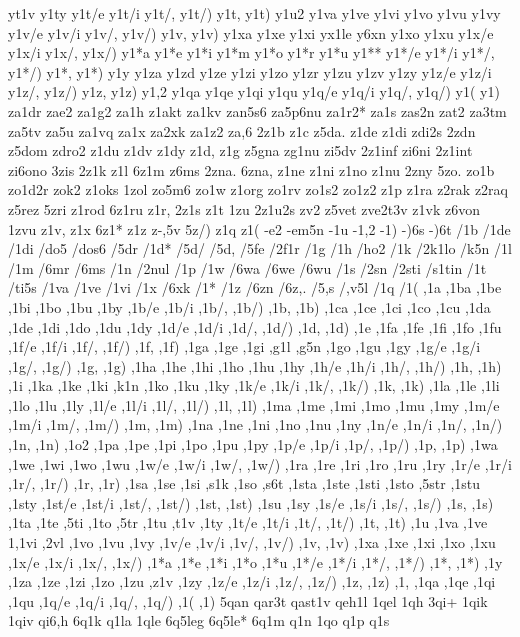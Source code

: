 {{yt1v
y1ty
y1t/e
y1t/i
y1t/,
y1t/)
y1t,
y1t)
y1u2
y1va
y1ve
y1vi
y1vo
y1vu
y1vy
y1v/e
y1v/i
y1v/,
y1v/)
y1v,
y1v)
y1xa
y1xe
y1xi
yx1le
y6xn
y1xo
y1xu
y1x/e
y1x/i
y1x/,
y1x/)
y1*a
y1*e
y1*i
y1*m
y1*o
y1*r
y1*u
y1**
y1*/e
y1*/i
y1*/,
y1*/)
y1*,
y1*)
y1y
y1za
y1zd
y1ze
y1zi
y1zo
y1zr
y1zu
y1zv
y1zy
y1z/e
y1z/i
y1z/,
y1z/)
y1z,
y1z)
y1,2
y1qa
y1qe
y1qi
y1qu
y1q/e
y1q/i
y1q/,
y1q/)
y1(
y1)
za1dr
zae2
za1g2
za1h
z1akt
za1kv
zan5s6
za5p6nu
za1r2*
za1s
zas2n
zat2
za3tm
za5tv
za5u
za1vq
za1x
za2xk
za1z2
za,6
2z1b
z1c
z5da.
z1de
z1di
zdi2s
2zdn
z5dom
zdro2
z1du
z1dv
z1dy
z1d,
z1g
z5gna
zg1nu
zi5dv
2z1inf
zi6ni
2z1int
zi6ono
3zis
2z1k
z1l
6z1m
z6ms
2zna.
6zna,
z1ne
z1ni
z1no
z1nu
2zny
5zo.
zo1b
zo1d2r
zok2
z1oks
1zol
zo5m6
zo1w
z1org
zo1rv
zo1s2
zo1z2
z1p
z1ra
z2rak
z2raq
z5rez
5zri
z1rod
6z1ru
z1r,
2z1s
z1t
1zu
2z1u2s
zv2
z5vet
zve2t3v
z1vk
z6von
1zvu
z1v,
z1x
6z1*
z1z
z-,5v
5z/)
z1q
z1(
-e2
-em5n
-1u
-1,2
-1)
-)6s
-)6t
/1b
/1de
/1di
/do5
/dos6
/5dr
/1d*
/5d/
/5d,
/5fe
/2f1r
/1g
/1h
/ho2
/1k
/2k1lo
/k5n
/1l
/1m
/6mr
/6ms
/1n
/2nul
/1p
/1w
/6wa
/6we
/6wu
/1s
/2sn
/2sti
/s1tin
/1t
/ti5s
/1va
/1ve
/1vi
/1x
/6xk
/1*
/1z
/6zn
/6z,.
/5,s
/,v5l
/1q
/1(
,1a
,1ba
,1be
,1bi
,1bo
,1bu
,1by
,1b/e
,1b/i
,1b/,
,1b/)
,1b,
,1b)
,1ca
,1ce
,1ci
,1co
,1cu
,1da
,1de
,1di
,1do
,1du
,1dy
,1d/e
,1d/i
,1d/,
,1d/)
,1d,
,1d)
,1e
,1fa
,1fe
,1fi
,1fo
,1fu
,1f/e
,1f/i
,1f/,
,1f/)
,1f,
,1f)
,1ga
,1ge
,1gi
,g1l
,g5n
,1go
,1gu
,1gy
,1g/e
,1g/i
,1g/,
,1g/)
,1g,
,1g)
,1ha
,1he
,1hi
,1ho
,1hu
,1hy
,1h/e
,1h/i
,1h/,
,1h/)
,1h,
,1h)
,1i
,1ka
,1ke
,1ki
,k1n
,1ko
,1ku
,1ky
,1k/e
,1k/i
,1k/,
,1k/)
,1k,
,1k)
,1la
,1le
,1li
,1lo
,1lu
,1ly
,1l/e
,1l/i
,1l/,
,1l/)
,1l,
,1l)
,1ma
,1me
,1mi
,1mo
,1mu
,1my
,1m/e
,1m/i
,1m/,
,1m/)
,1m,
,1m)
,1na
,1ne
,1ni
,1no
,1nu
,1ny
,1n/e
,1n/i
,1n/,
,1n/)
,1n,
,1n)
,1o2
,1pa
,1pe
,1pi
,1po
,1pu
,1py
,1p/e
,1p/i
,1p/,
,1p/)
,1p,
,1p)
,1wa
,1we
,1wi
,1wo
,1wu
,1w/e
,1w/i
,1w/,
,1w/)
,1ra
,1re
,1ri
,1ro
,1ru
,1ry
,1r/e
,1r/i
,1r/,
,1r/)
,1r,
,1r)
,1sa
,1se
,1si
,s1k
,1so
,s6t
,1sta
,1ste
,1sti
,1sto
,5str
,1stu
,1sty
,1st/e
,1st/i
,1st/,
,1st/)
,1st,
,1st)
,1su
,1sy
,1s/e
,1s/i
,1s/,
,1s/)
,1s,
,1s)
,1ta
,1te
,5ti
,1to
,5tr
,1tu
,t1v
,1ty
,1t/e
,1t/i
,1t/,
,1t/)
,1t,
,1t)
,1u
,1va
,1ve
1,1vi
,2vl
,1vo
,1vu
,1vy
,1v/e
,1v/i
,1v/,
,1v/)
,1v,
,1v)
,1xa
,1xe
,1xi
,1xo
,1xu
,1x/e
,1x/i
,1x/,
,1x/)
,1*a
,1*e
,1*i
,1*o
,1*u
,1*/e
,1*/i
,1*/,
,1*/)
,1*,
,1*)
,1y
,1za
,1ze
,1zi
,1zo
,1zu
,z1v
,1zy
,1z/e
,1z/i
,1z/,
,1z/)
,1z,
,1z)
,1,
,1qa
,1qe
,1qi
,1qu
,1q/e
,1q/i
,1q/,
,1q/)
,1(
,1)
5qan
qar3t
qast1v
qeh1l
1qel
1qh
3qi+
1qik
1qiv
qi6,h
6q1k
q1la
1qle
6q5leg
6q5le*
6q1m
q1n
1qo
q1p
q1s
}}
